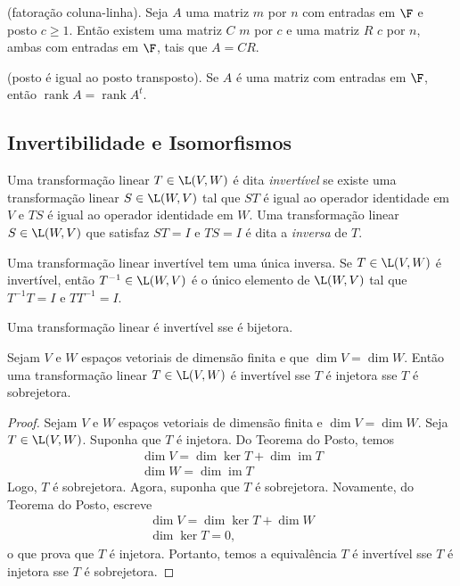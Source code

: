 \documentclass{article}
\DeclareMathOperator{\im}{im}
\DeclareMathOperator{\rank}{rank}
\begin{document}
\begin{prop} (fatoração coluna-linha).
    Seja \(A\) uma matriz \(m\) por \(n\) com entradas em \(\F\) e posto \(c \geq 1\). Então existem uma matriz \(C\) \(m\) por \(c\) e uma matriz \(R\) \(c\) por \(n\), ambas com entradas em \(\F\), tais que \(A = CR\).
\end{prop}

\begin{prop} (posto é igual ao posto transposto).
    Se \(A\) é uma matriz com entradas em \(\F\), então \(\rank A = \rank A^t\).
\end{prop}

\subsection{Invertibilidade e Isomorfismos}
\begin{defn}
    Uma transformação linear \(T \in \L(V, W)\) é dita \emph{invertível} se existe uma transformação linear \(S \in \L(W, V)\) tal que \(ST\) é igual ao operador identidade em \(V\) e \(TS\) é igual ao operador identidade em \(W\). Uma transformação linear \(S \in \L(W, V)\) que satisfaz \(ST = I\) e \(TS = I\) é dita a \emph{inversa} de \(T\).
\end{defn}

\begin{prop}
    Uma transformação linear invertível tem uma única inversa. Se \(T \in \L(V, W)\) é invertível, então \(T^{-1} \in \L(W, V)\) é o único elemento de \(\L(W, V)\) tal que \(T^{-1}T = I\) e \(TT^{-1} = I\).
\end{prop}

\begin{prop}
    Uma transformação linear é invertível sse é bijetora.
\end{prop}

\begin{prop}
    Sejam \(V\) e \(W\) espaços vetoriais de dimensão finita e que \(\dim V = \dim W\). Então uma transformação linear \(T \in \L(V, W)\) é invertível sse \(T\) é injetora sse \(T\) é sobrejetora.
\end{prop}

\begin{proof}
    Sejam \(V\) e \(W\) espaços vetoriais de dimensão finita e \(\dim V = \dim W\). Seja \(T \in \L(V, W)\). Suponha que \(T\) é injetora. Do Teorema do Posto, temos 
    \begin{gather}
        \dim V = \dim \ker T + \dim \im T \\
        \dim W = \dim \im T
    \end{gather}
    Logo, \(T\) é sobrejetora. Agora, suponha que \(T\) é sobrejetora. Novamente, do Teorema do Posto, escreve 
    \begin{gather}
        \dim V = \dim \ker T + \dim W \\
        \dim \ker T = 0,
    \end{gather} 
    \noindent o que prova que \(T\) é injetora. Portanto, temos a equivalência \(T\) é invertível sse \(T\) é injetora sse \(T\) é sobrejetora.
\end{proof}
\end{document}
